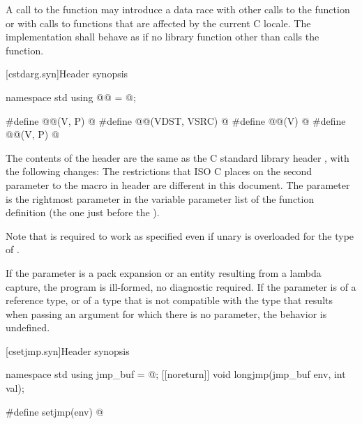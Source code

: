 \pnum
A call to the  function
may introduce a data race with other
calls to the  function or with calls to functions that are
affected by the current C locale. The implementation shall behave as if no
library function other than  calls the 
function.

[cstdarg.syn]{Header  synopsis}

%
\begin{codeblock}
namespace std {
  using @@ = @\seebelow@;
}

#define @@(V, P) @\seebelow@
#define @@(VDST, VSRC) @\seebelow@
#define @@(V) @\seebelow@
#define @@(V, P) @\seebelow@
\end{codeblock}

\pnum
The contents of the header  are the same as the C
standard library header , with the following changes:
The restrictions that ISO C places on the second parameter to the
%
 macro in header 
are different in this document.
The parameter
is the rightmost parameter in the variable parameter list
of the function definition (the one just before the
).
\begin{footnote}
Note that
is required to work as specified even if unary
is overloaded for the type of
.
\end{footnote}
If the parameter  is a pack expansion or
an entity resulting from a lambda capture,
the program is ill-formed, no diagnostic required.
If the parameter
is of a reference type, or of a type that is not compatible with the
type that results when passing an argument for which there is no
parameter, the behavior is undefined.


[csetjmp.syn]{Header  synopsis}

%
%
%
\begin{codeblock}
namespace std {
  using jmp_buf = @\seebelow@;
  [[noreturn]] void longjmp(jmp_buf env, int val);
}

#define setjmp(env) @\seebelow@
\end{codeblock}

